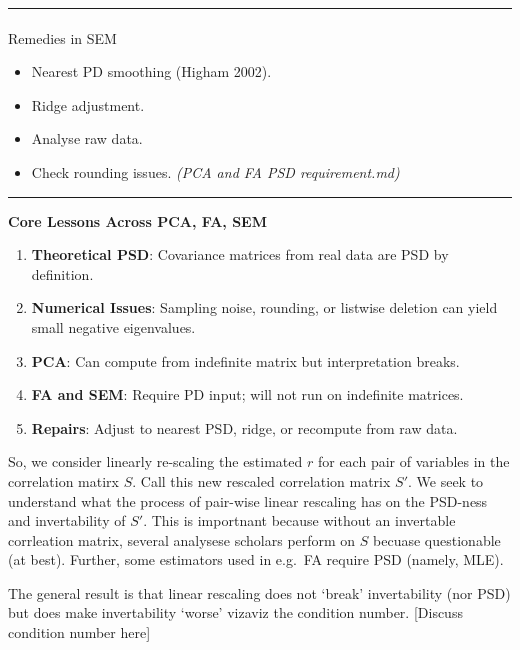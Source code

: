 \documentclass[
  12pt,
]{article}
\makeatletter
\let\oldparagraph\paragraph
\renewcommand{\paragraph}{
    \@ifstar
      \xxxParagraphStar
      \xxxParagraphNoStar
  }
\newcommand{\xxxParagraphStar}[1]{\oldparagraph*{#1}\mbox{}}
\newcommand{\xxxParagraphNoStar}[1]{\oldparagraph{#1}\mbox{}}
\providecommand{\tightlist}{%
  \setlength{\itemsep}{0pt}\setlength{\parskip}{0pt}}
\theoremstyle{plain}
\theoremstyle{definition}
\theoremstyle{remark}
\makeatother
\begin{document}
\begin{center}\rule{0.5\linewidth}{0.5pt}\end{center}

\paragraph{Remedies in SEM}\label{remedies-in-sem}

\begin{itemize}
\tightlist
\item
  Nearest PD smoothing (Higham 2002).
\item
  Ridge adjustment.
\item
  Analyse raw data.
\item
  Check rounding issues. \emph{(PCA and FA PSD requirement.md)}
\end{itemize}

\begin{center}\rule{0.5\linewidth}{0.5pt}\end{center}

\textbf{Core Lessons Across PCA, FA, SEM}

\begin{enumerate}
\def\labelenumi{\arabic{enumi}.}
\tightlist
\item
  \textbf{Theoretical PSD}: Covariance matrices from real data are PSD
  by definition.
\item
  \textbf{Numerical Issues}: Sampling noise, rounding, or listwise
  deletion can yield small negative eigenvalues.
\item
  \textbf{PCA}: Can compute from indefinite matrix but interpretation
  breaks.
\item
  \textbf{FA and SEM}: Require PD input; will not run on indefinite
  matrices.
\item
  \textbf{Repairs}: Adjust to nearest PSD, ridge, or recompute from raw
  data.
\end{enumerate}

So, we consider linearly re-scaling the estimated \(r\) for each pair of
variables in the correlation matirx \(S\). Call this new rescaled
correlation matrix \(S'\). We seek to understand what the process of
pair-wise linear rescaling has on the PSD-ness and invertability of
\(S'\). This is importnant because without an invertable corrleation
matrix, several analysese scholars perform on \(S\) becuase questionable
(at best). Further, some estimators used in e.g.~FA require PSD (namely,
MLE).

The general result is that linear rescaling does not `break'
invertability (nor PSD) but does make invertability `worse' vizaviz the
condition number. {[}Discuss condition number here{]}
\end{document}
